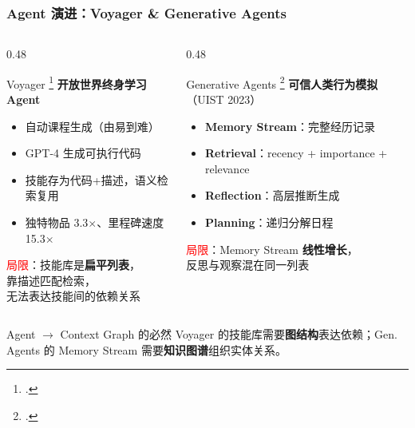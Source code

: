 \documentclass[aspectratio=169,10pt]{beamer}
\let\oldcite\cite
\renewcommand{\cite}[1]{\oldcite{#1}\footcitetext{#1}}
\begin{document}
\begin{frame}
  \frametitle{Agent 演进：Voyager \& Generative Agents}

  \begin{columns}[T]
    \begin{column}{0.48\textwidth}
      \begin{block}{Voyager \cite{wang2024voyager}}
        \small
        \textbf{开放世界终身学习 Agent}
        \begin{itemize}
          \item 自动课程生成（由易到难）
          \item GPT-4 生成可执行代码
          \item 技能存为代码+描述，语义检索复用
          \item 独特物品 3.3$\times$、里程碑速度 15.3$\times$
        \end{itemize}
        \vspace{0.1cm}
        \textcolor{red}{局限}：技能库是\textbf{扁平列表}，\\靠描述匹配检索，\\无法表达技能间的依赖关系
      \end{block}
    \end{column}

    \begin{column}{0.48\textwidth}
      \begin{block}{Generative Agents \cite{park2023generative}}
        \small
        \textbf{可信人类行为模拟}（UIST 2023）
        \begin{itemize}
          \item \textbf{Memory Stream}：完整经历记录
          \item \textbf{Retrieval}：recency + importance + relevance
          \item \textbf{Reflection}：高层推断生成
          \item \textbf{Planning}：递归分解日程
        \end{itemize}
        \vspace{0.1cm}
        \textcolor{red}{局限}：Memory Stream \textbf{线性增长}，\\反思与观察混在同一列表
      \end{block}
    \end{column}
  \end{columns}

  \vspace{0.2cm}

  \begin{alertblock}{Agent $\rightarrow$ Context Graph 的必然}
    Voyager 的技能库需要\textbf{图结构}表达依赖；Gen. Agents 的 Memory Stream 需要\textbf{知识图谱}组织实体关系。
  \end{alertblock}
\end{frame}
\end{document}
